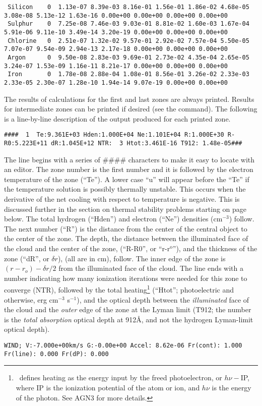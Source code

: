 {\begin{verbatim}
 Silicon    0  1.13e-07 8.39e-03 8.16e-01 1.56e-01 1.86e-02 4.68e-05 3.08e-08 5.13e-12 1.63e-16 0.00e+00 0.00e+00 0.00e+00 0.00e+00
 Sulphur    0  7.25e-08 7.46e-03 9.03e-01 8.81e-02 1.60e-03 1.67e-04 5.91e-06 9.11e-10 3.49e-14 3.20e-19 0.00e+00 0.00e+00 0.00e+00
 Chlorine   0  2.51e-07 1.32e-02 9.57e-01 2.92e-02 7.57e-04 5.50e-05 7.07e-07 9.54e-09 2.94e-13 2.17e-18 0.00e+00 0.00e+00 0.00e+00
 Argon      0  9.50e-08 2.83e-03 9.69e-01 2.73e-02 4.35e-04 2.65e-05 3.24e-07 1.53e-09 1.16e-11 8.21e-17 0.00e+00 0.00e+00 0.00e+00
 Iron       0  1.78e-08 2.88e-04 1.08e-01 8.56e-01 3.26e-02 2.33e-03 2.33e-05 2.30e-07 1.28e-10 1.94e-14 9.07e-19 0.00e+00 0.00e+00
\end{verbatim}
}

The results of calculations for the first and last zones are always
printed.
Results for intermediate zones can be printed if desired (see
the  command).
The following is a line-by-line description of
the output produced for each printed zone.
{\setverbatimfontsize{\tiny}
\begin{verbatim}
####  1  Te:9.361E+03 Hden:1.000E+04 Ne:1.101E+04 R:1.000E+30 R-R0:5.223E+11 dR:1.045E+12 NTR:  3 Htot:3.461E-16 T912: 1.48e-05###
\end{verbatim}
}

The line begins with a series of \#\#\#\# characters to make it easy
to locate with an editor.
The zone number is the first number and it is
followed by the electron temperature of the zone (``Te'').
A lower case
``u'' will appear before the ``Te'' if the temperature solution is possibly
thermally unstable.
This occurs when the derivative of the net cooling
with respect to temperature is negative.
This is discussed further in the
section on thermal stability problems starting on page
\pageref{sec:ThermalStabilityProblems} below.
The total hydrogen (``Hden'')
and electron (``Ne'') densities (cm$^{-3}$) follow.
The next number (``R'')
is the distance from the center of the central object to the center of the
zone.
The depth, the distance between the illuminated face of the cloud
and the center of the zone, (``R-R0'', or ``r-r$^{\mathrm{o}}$''),
and the thickness of
the zone (``dR'', or $\delta r$), (all are in cm), follow.
The inner edge of the
zone is $( {r - {r_o}} ) - \delta r/2$
from the illuminated face of the cloud.
The line ends with a number
indicating how many ionization iterations were needed for this zone to
converge (NTR), followed by the total heating\footnote{\Cloudy\ defines heating as the energy input by the freed photoelectron,
or $h\nu - $IP, where IP is the ionization potential of the atom or ion, and
$h\nu$ is the energy of the photon.  See AGN3 for more details.} (``Htot''; photoelectric
and otherwise, erg cm$^{-3}$ s$^{-1}$),
and the optical depth between the
\emph{illuminated}
face of the cloud and the \emph{outer} edge of the zone at the Lyman limit (T912;
the number is the \emph{total absorption} optical depth at 912\AA,
and not the
hydrogen Lyman-limit optical depth).
{\setverbatimfontsize{\tiny}
\begin{verbatim}
WIND; V:-7.000e+00km/s G:-0.00e+00 Accel: 8.62e-06 Fr(cont): 1.000 Fr(line): 0.000 Fr(dP): 0.000
\end{verbatim}
}

